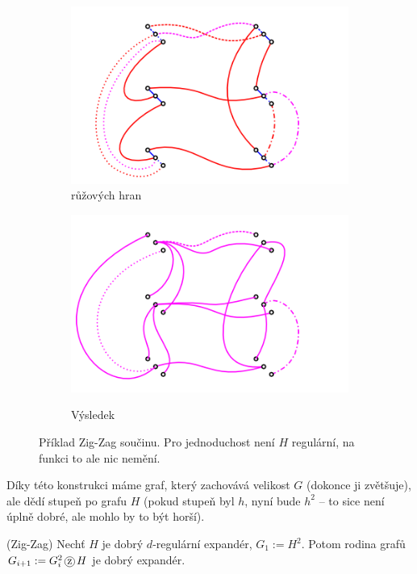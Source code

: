 \begin{figure}
\begin{subfigure}{7.5cm}{\includegraphics[width=\textwidth]{img/zigzag3.png}}
{růžových hran}\end{subfigure}
\begin{subfigure}{7.5cm}{\includegraphics[width=\textwidth]{img/zigzag4.png}}\caption{Výsledek}\end{subfigure}
\caption{Příklad Zig-Zag součinu. Pro jednoduchost není $H$ regulární, na funkci
to ale nic nemění.}
\label{zigzag-konstrukce}
\end{figure}

\poz Díky této konstrukci máme graf, který zachovává velikost $G$ (dokonce ji 
zvětšuje), ale dědí stupeň po grafu $H$ (pokud stupeň byl $h$, nyní bude $h^2$ 
-- to sice není úplně dobré, ale mohlo by to být horší).

\vt (Zig-Zag) Nechť $H$ je dobrý $d$-regulární expandér, $G_1 := H^2$. Potom 
rodina grafů $G_{i+1} := G^2_i\zz H$ je dobrý expandér.
